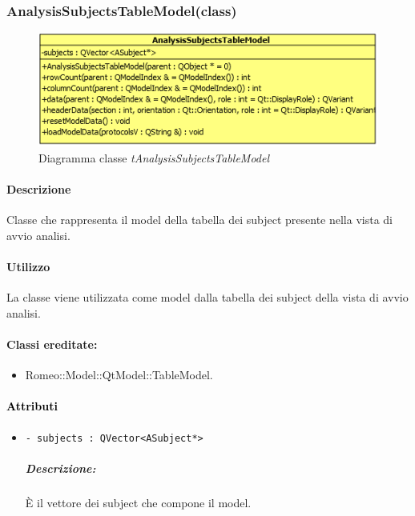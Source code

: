 \subsubsection{AnalysisSubjectsTableModel(class)}
\label{AnalysisSubjectsTableModel}
\begin{figure}[!h]
	\centering
	\includegraphics[width=0.6\linewidth]{./Content/Immagini/QtModel/AnalysisSubjectsTableModel.png}
	\caption{Diagramma classe \textsl{tAnalysisSubjectsTableModel}}
	\label{comp_AnalysisSubjectsTableModel}
\end{figure}

\paragraph{Descrizione\\} 
Classe che rappresenta il model della tabella dei subject\g{} presente nella vista di avvio analisi.

\paragraph{Utilizzo\\}
La classe viene utilizzata come model dalla tabella dei subject\g{} della vista di avvio analisi.

\paragraph{Classi ereditate:}
\begin{itemize}
	\item Romeo::Model::QtModel::TableModel.
\end{itemize}

\paragraph{\textcolor{black}{Attributi\\}}
	\begin{itemize}
		\item \color{teal}\verb!- subjects : QVector<ASubject*>!
		\color{black}
		\subparagraph{Descrizione:} È il vettore dei subject\g{} che compone il model.
	\end{itemize}
	
